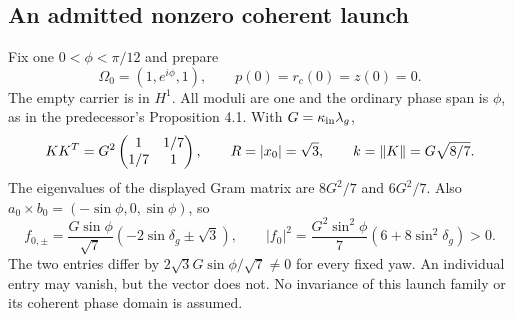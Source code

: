 \subsection{An admitted nonzero coherent launch}\label{sec:launch}
Fix one $0<\phi<\pi/12$ and prepare
\begin{equation}\label{eq:preparation}
\Omega_0=(1,e^{i\phi},1),\qquad p(0)=r_c(0)=z(0)=0.
\end{equation}
The empty carrier is in $H^1$. All moduli are one and the ordinary phase span is $\phi$, as in the predecessor's Proposition 4.1. With $G=\kappa_{\rm in}\lambda_g$,
\begin{equation}\label{eq:gram}
KK^T=G^2\begin{pmatrix}1&1/7\\1/7&1\end{pmatrix},
\qquad R=|x_0|=\sqrt3,\qquad k=\left\|K\right\|=G\sqrt{8/7}.
\end{equation}
The eigenvalues of the displayed Gram matrix are $8G^2/7$ and $6G^2/7$. Also $a_0\times b_0=(-\sin\phi,0,\sin\phi)$, so
\begin{equation}\label{eq:launchdrive}
f_{0,\pm}=\frac{G\sin\phi}{\sqrt7}(-2\sin\delta_g\pm\sqrt3),
\qquad |f_0|^2=\frac{G^2\sin^2\phi}{7}(6+8\sin^2\delta_g)>0.
\end{equation}
The two entries differ by $2\sqrt3G\sin\phi/\sqrt7\ne0$ for every fixed yaw. An individual entry may vanish, but the vector does not. No invariance of this launch family or its coherent phase domain is assumed.
